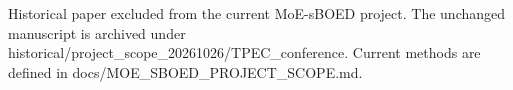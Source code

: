 \documentclass{article}
\begin{document}
Historical paper excluded from the current MoE-sBOED project. The unchanged manuscript is archived under historical/project\_scope\_20261026/TPEC\_conference. Current methods are defined in docs/MOE\_SBOED\_PROJECT\_SCOPE.md.
\end{document}
